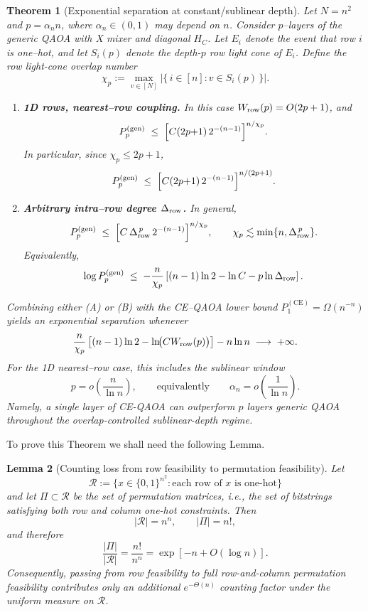 \documentclass[a4paper,onecolumn,11pt,unpublished]{quantumarticle}
\newtheorem{theorem}{Theorem}
\newtheorem{lemma}[theorem]{Lemma}
\theoremstyle{remark}
\begin{document}
\begin{theorem}[Exponential separation at constant/sublinear depth]
\label{thm:generic-const}
Let $N=n^2$ and $p=\alpha_n n$, where $\alpha_n\in(0,1)$ may depend on $n$.
Consider $p$–layers of the generic QAOA with X mixer and diagonal $H_C$.
Let $E_i$ denote the event that row $i$ is one--hot, and let $S_i(p)$ denote
the depth-$p$ row light cone of $E_i$. Define the row light-cone overlap number
\[
  \chi_p
  :=
  \max_{v\in[N]}
  \left|\{\,i\in[n]: v\in S_i(p)\,\}\right|.
\]
\begin{enumerate}
\item[(A)] \textbf{1D rows, nearest–row coupling.}
In this case \(W_{\rm row}(p)=O(2p+1)\), and
\[
  P_{p}^{\mathrm{(gen)}}
  \;\le\;
  \Bigl[C(2p{+}1)\,2^{-(n-1)}\Bigr]^{n/\chi_p}.
\]
In particular, since \(\chi_p\le 2p+1\),
\[
  P_{p}^{\mathrm{(gen)}}
  \;\le\;
  \Bigl[C(2p{+}1)\,2^{-(n-1)}\Bigr]^{n/(2p+1)}.
\]

\item[(B)] \textbf{Arbitrary intra–row degree $\Delta_{\rm row}$.}
In general,
\begin{equation}
  P_{p}^{\mathrm{(gen)}}
  \;\le\;
  \Bigl[C\,\Delta_{\rm row}^{\,p}\,2^{-(n-1)}\Bigr]^{n/\chi_p},
  \qquad
  \chi_p\lesssim \min\{n,\Delta_{\rm row}^{\,p}\}.
  \label{eq:linearn}
\end{equation}
Equivalently,
\[
  \log P_{p}^{\mathrm{(gen)}}
  \;\le\;
  -\frac{n}{\chi_p}
  \left[
    (n-1)\ln 2
    -
    \ln C
    -
    p\ln \Delta_{\rm row}
  \right].
\]
\end{enumerate}
Combining either (A) or (B) with the CE–QAOA lower bound
$P_{1}^{\mathrm{(CE)}}=\Omega(n^{-n})$ yields an exponential separation
whenever
\[
  \frac{n}{\chi_p}
  \left[
    (n-1)\ln 2
    -
    \ln\!\bigl(CW_{\rm row}(p)\bigr)
  \right]
  -
  n\ln n
  \;\longrightarrow\;+\infty .
\]
For the 1D nearest–row case, this includes the sublinear window
\[
  p=o\!\left(\frac{n}{\ln n}\right),
  \qquad\text{equivalently}\qquad
  \alpha_n=o\!\left(\frac{1}{\ln n}\right).
\]
Namely, a single layer of CE-QAOA can outperform $p$ layers generic QAOA
throughout the overlap-controlled sublinear-depth regime.

\end{theorem}

To prove this Theorem we shall need the following Lemma.



\begin{lemma}[Counting loss from row feasibility to permutation feasibility]
\label{lem:row-to-permutation-counting}
Let
\[
  \mathcal R
  :=
  \{x\in\{0,1\}^{n^2}: \text{each row of }x\text{ is one-hot}\}
\]
and let \(\Pi\subset\mathcal R\) be the set of permutation matrices, i.e.,
the set of bitstrings satisfying both row and column one-hot constraints.
Then
\[
  |\mathcal R|=n^n,
  \qquad
  |\Pi|=n!,
\]
and therefore
\[
  \frac{|\Pi|}{|\mathcal R|}
  =
  \frac{n!}{n^n}
  =
  \exp[-n+O(\log n)].
\]
Consequently, passing from row feasibility to full row-and-column
permutation feasibility contributes only an additional \(e^{-\Theta(n)}\)
counting factor under the uniform measure on \(\mathcal R\).
\end{lemma}
\end{document}
